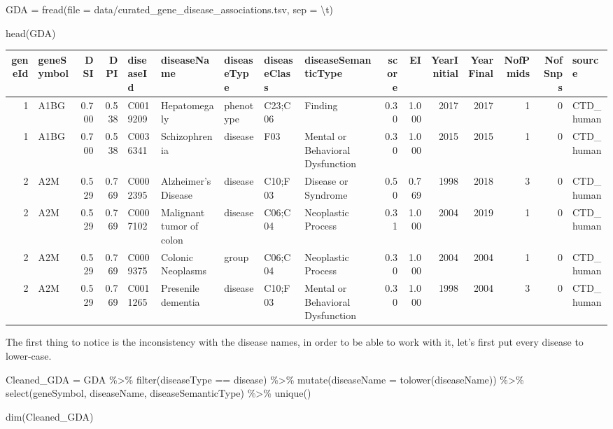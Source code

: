 \documentclass[
]{book}
\newenvironment{Shaded}{\begin{snugshade}}{\end{snugshade}}
\newcommand{\AttributeTok}[1]{\textcolor[rgb]{0.77,0.63,0.00}{#1}}
\newcommand{\FunctionTok}[1]{\textcolor[rgb]{0.00,0.00,0.00}{#1}}
\newcommand{\NormalTok}[1]{#1}
\newcommand{\OtherTok}[1]{\textcolor[rgb]{0.56,0.35,0.01}{#1}}
\newcommand{\SpecialCharTok}[1]{\textcolor[rgb]{0.00,0.00,0.00}{#1}}
\newcommand{\StringTok}[1]{\textcolor[rgb]{0.31,0.60,0.02}{#1}}
\begin{document}
\begin{Shaded}
\begin{Highlighting}[]
\NormalTok{GDA }\OtherTok{=} \FunctionTok{fread}\NormalTok{(}\AttributeTok{file =} \StringTok{\textquotesingle{}data/curated\_gene\_disease\_associations.tsv\textquotesingle{}}\NormalTok{, }\AttributeTok{sep =} \StringTok{\textquotesingle{}}\SpecialCharTok{\textbackslash{}t}\StringTok{\textquotesingle{}}\NormalTok{)}

\FunctionTok{head}\NormalTok{(GDA)}
\end{Highlighting}
\end{Shaded}

\begin{tabular}{r|l|r|r|l|l|l|l|l|r|r|r|r|r|r|l}
\hline
geneId & geneSymbol & DSI & DPI & diseaseId & diseaseName & diseaseType & diseaseClass & diseaseSemanticType & score & EI & YearInitial & YearFinal & NofPmids & NofSnps & source\\
\hline
1 & A1BG & 0.700 & 0.538 & C0019209 & Hepatomegaly & phenotype & C23;C06 & Finding & 0.30 & 1.000 & 2017 & 2017 & 1 & 0 & CTD\_human\\
\hline
1 & A1BG & 0.700 & 0.538 & C0036341 & Schizophrenia & disease & F03 & Mental or Behavioral Dysfunction & 0.30 & 1.000 & 2015 & 2015 & 1 & 0 & CTD\_human\\
\hline
2 & A2M & 0.529 & 0.769 & C0002395 & Alzheimer's Disease & disease & C10;F03 & Disease or Syndrome & 0.50 & 0.769 & 1998 & 2018 & 3 & 0 & CTD\_human\\
\hline
2 & A2M & 0.529 & 0.769 & C0007102 & Malignant tumor of colon & disease & C06;C04 & Neoplastic Process & 0.31 & 1.000 & 2004 & 2019 & 1 & 0 & CTD\_human\\
\hline
2 & A2M & 0.529 & 0.769 & C0009375 & Colonic Neoplasms & group & C06;C04 & Neoplastic Process & 0.30 & 1.000 & 2004 & 2004 & 1 & 0 & CTD\_human\\
\hline
2 & A2M & 0.529 & 0.769 & C0011265 & Presenile dementia & disease & C10;F03 & Mental or Behavioral Dysfunction & 0.30 & 1.000 & 1998 & 2004 & 3 & 0 & CTD\_human\\
\hline
\end{tabular}

The first thing to notice is the inconsistency with the disease names, in order to be able to work with it, let's first put every disease to lower-case.

\begin{Shaded}
\begin{Highlighting}[]
\NormalTok{Cleaned\_GDA }\OtherTok{=}\NormalTok{ GDA }\SpecialCharTok{\%\textgreater{}\%} \FunctionTok{filter}\NormalTok{(diseaseType }\SpecialCharTok{==} \StringTok{\textquotesingle{}disease\textquotesingle{}}\NormalTok{) }\SpecialCharTok{\%\textgreater{}\%}
  \FunctionTok{mutate}\NormalTok{(}\AttributeTok{diseaseName =} \FunctionTok{tolower}\NormalTok{(diseaseName)) }\SpecialCharTok{\%\textgreater{}\%}
  \FunctionTok{select}\NormalTok{(geneSymbol, diseaseName, diseaseSemanticType) }\SpecialCharTok{\%\textgreater{}\%}
  \FunctionTok{unique}\NormalTok{() }

\FunctionTok{dim}\NormalTok{(Cleaned\_GDA)}
\end{Highlighting}
\end{Shaded}
\end{document}
